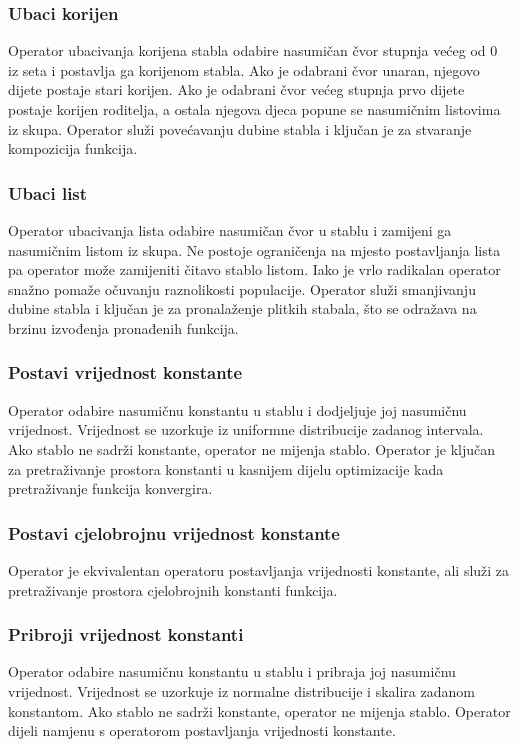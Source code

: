 \documentclass[times, utf8, numeric, diplomski]{fer}
\begin{document}
\subsubsection{Ubaci korijen}
Operator ubacivanja korijena stabla odabire nasumičan čvor stupnja većeg od 0 iz seta i postavlja ga korijenom stabla. Ako je odabrani čvor unaran, njegovo dijete postaje stari korijen. Ako je odabrani čvor većeg stupnja prvo dijete postaje korijen roditelja, a ostala njegova djeca popune se nasumičnim listovima iz skupa. Operator služi povećavanju dubine stabla i ključan je za stvaranje kompozicija funkcija.

\subsubsection{Ubaci list}
Operator ubacivanja lista odabire nasumičan čvor u stablu i zamijeni ga nasumičnim listom iz skupa. Ne postoje ograničenja na mjesto postavljanja lista pa operator može zamijeniti čitavo stablo listom. Iako je vrlo radikalan operator snažno pomaže očuvanju raznolikosti populacije. Operator služi smanjivanju dubine stabla i ključan je za pronalaženje plitkih stabala, što se odražava na brzinu izvođenja pronađenih funkcija.

\subsubsection{Postavi vrijednost konstante}
Operator odabire nasumičnu konstantu u stablu i dodjeljuje joj nasumičnu vrijednost. Vrijednost se uzorkuje iz uniformne distribucije zadanog intervala. Ako stablo ne sadrži konstante, operator ne mijenja stablo. Operator je ključan za pretraživanje prostora konstanti u kasnijem dijelu optimizacije kada pretraživanje funkcija konvergira.

\subsubsection{Postavi cjelobrojnu vrijednost konstante}
Operator je ekvivalentan operatoru postavljanja vrijednosti konstante, ali služi za pretraživanje prostora cjelobrojnih konstanti funkcija.

\subsubsection{Pribroji vrijednost konstanti}
Operator odabire nasumičnu konstantu u stablu i pribraja joj nasumičnu vrijednost. Vrijednost se uzorkuje iz normalne distribucije i skalira zadanom konstantom. Ako stablo ne sadrži konstante, operator ne mijenja stablo. Operator dijeli namjenu s operatorom postavljanja vrijednosti konstante.
\end{document}
